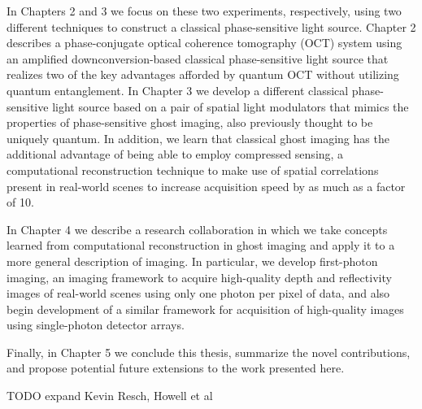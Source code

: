 In Chapters 2 and 3 we focus on these two experiments, respectively, using two different techniques to construct a classical phase-sensitive light source. Chapter 2 describes a phase-conjugate optical coherence tomography (OCT) system using an amplified downconversion-based classical phase-sensitive light source that realizes two of the key advantages afforded by quantum OCT without utilizing quantum entanglement. In Chapter 3 we develop a different classical phase-sensitive light source based on a pair of spatial light modulators that mimics the properties of phase-sensitive ghost imaging, also previously thought to be uniquely quantum. In addition, we learn that classical ghost imaging has the additional advantage of being able to employ compressed sensing, a computational reconstruction technique to make use of spatial correlations present in real-world scenes to increase acquisition speed by as much as a factor of 10.

In Chapter 4 we describe a research collaboration in which we take concepts learned from computational reconstruction in ghost imaging and apply it to a more general description of imaging. In particular, we develop first-photon imaging, an imaging framework to acquire high-quality depth and reflectivity images of real-world scenes using only one photon per pixel of data, and also begin development of a similar framework for acquisition of high-quality images using single-photon detector arrays.

Finally, in Chapter 5 we conclude this thesis, summarize the novel contributions, and propose potential future extensions to the work presented here.

TODO expand Kevin Resch, Howell et al

